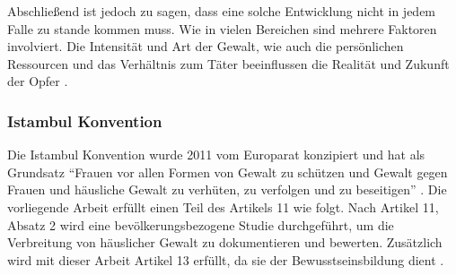 Abschließend ist jedoch zu sagen, dass eine solche Entwicklung nicht in jedem Falle zu stande kommen muss. Wie in vielen Bereichen sind mehrere Faktoren involviert. Die Intensität und Art der Gewalt, wie auch die persönlichen Ressourcen und das Verhältnis zum Täter beeinflussen die Realität und Zukunft der Opfer \parencite{Def_Form_Folge_Gewalt}.

\subsubsection{Istambul Konvention}     \label{2.1.2.4}
Die Istambul Konvention wurde 2011 vom Europarat konzipiert und hat als Grundsatz \enquote{Frauen vor allen Formen von Gewalt zu schützen und Gewalt gegen Frauen und häusliche Gewalt zu verhüten, zu verfolgen und zu beseitigen} \parencite{Istambul_Konvention}. Die vorliegende Arbeit erfüllt einen Teil des Artikels 11 wie folgt. Nach Artikel 11, Absatz 2 wird eine bevölkerungsbezogene Studie durchgeführt, um die Verbreitung von häuslicher Gewalt zu dokumentieren und bewerten. Zusätzlich wird mit dieser Arbeit Artikel 13 erfüllt, da sie der Bewusstseinsbildung dient \parencite{Istambul_Konvention}.